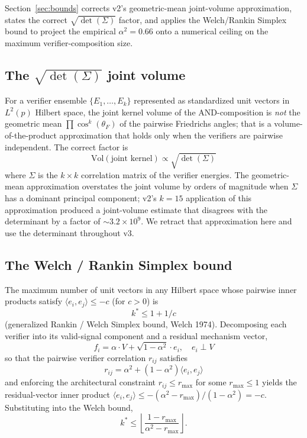 \documentclass[10pt]{article}
\begin{document}
Section~\ref{sec:bounds} corrects v2's geometric-mean joint-volume
approximation, states the correct $\sqrt{\det(\Sigma)}$ factor, and
applies the Welch/Rankin Simplex bound to project the empirical
$\alpha^2 = 0.66$ onto a numerical ceiling on the maximum
verifier-composition size.

\subsection{The $\sqrt{\det(\Sigma)}$ joint volume}

For a verifier ensemble $\{E_1, \dots, E_k\}$ represented as
standardized unit vectors in $L^2(p)$ Hilbert space, the joint
kernel volume of the AND-composition is \emph{not} the geometric
mean $\prod \cos^k(\theta_F)$ of the pairwise Friedrichs angles;
that is a volume-of-the-product approximation that holds only when
the verifiers are pairwise independent. The correct factor is
\begin{equation}
  \mathrm{Vol}(\text{joint kernel}) \propto \sqrt{\det(\Sigma)}
\end{equation}
where $\Sigma$ is the $k \times k$ correlation matrix of the
verifier energies. The geometric-mean approximation overstates the
joint volume by orders of magnitude when $\Sigma$ has a dominant
principal component; v2's $k = 15$ application of this approximation
produced a joint-volume estimate that disagrees with the determinant
by a factor of $\sim 3.2 \times 10^9$. We retract that approximation
here and use the determinant throughout v3.

\subsection{The Welch / Rankin Simplex bound}

The maximum number of unit vectors in any Hilbert space whose
pairwise inner products satisfy $\langle e_i, e_j \rangle \leq -c$
(for $c > 0$) is
\begin{equation}
  k^* \leq 1 + 1/c
\end{equation}
(generalized Rankin / Welch Simplex bound, Welch 1974).
Decomposing each verifier into its valid-signal component and a
residual mechanism vector,
\begin{equation}
  f_i = \alpha \cdot V + \sqrt{1 - \alpha^2} \cdot e_i,
  \quad e_i \perp V
\end{equation}
so that the pairwise verifier correlation $r_{ij}$ satisfies
\begin{equation}
  r_{ij} = \alpha^2 + (1 - \alpha^2) \langle e_i, e_j \rangle
\end{equation}
and enforcing the architectural constraint $r_{ij} \leq r_{\max}$
for some $r_{\max} \leq 1$ yields the residual-vector inner product
$\langle e_i, e_j \rangle \leq
-(\alpha^2 - r_{\max})/(1 - \alpha^2) = -c$. Substituting into the
Welch bound,
\begin{equation}
  k^* \leq \left\lfloor \frac{1 - r_{\max}}
                       {\alpha^2 - r_{\max}} \right\rfloor.
\end{equation}
\end{document}
